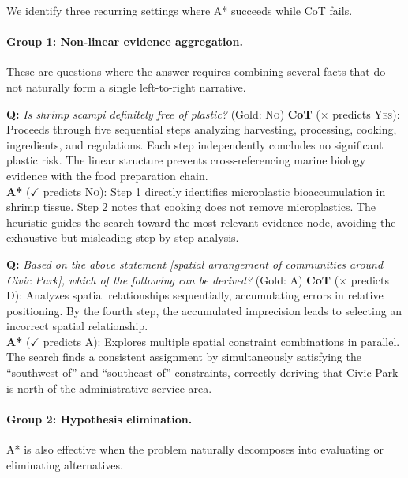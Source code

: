 \documentclass[11pt]{article}
\begin{document}
{We identify three recurring settings where A* succeeds while CoT fails.

\paragraph{Group 1: Non-linear evidence aggregation.}
These are questions where the answer requires combining several facts that do not naturally form a single left-to-right narrative.

\begin{examplebox}[title=StrategyQA --- Non-linear Evidence Aggregation]
\textbf{Q:} \emph{Is shrimp scampi definitely free of plastic?} \quad (Gold: \textsc{No})
\tcblower
\textbf{CoT} ($\times$ predicts \textsc{Yes}): Proceeds through five sequential steps analyzing harvesting, processing, cooking, ingredients, and regulations. Each step independently concludes no significant plastic risk. The linear structure prevents cross-referencing marine biology evidence with the food preparation chain.\\[4pt]
\textbf{A*} ($\checkmark$ predicts \textsc{No}): Step 1 directly identifies microplastic bioaccumulation in shrimp tissue. Step 2 notes that cooking does not remove microplastics. The heuristic guides the search toward the most relevant evidence node, avoiding the exhaustive but misleading step-by-step analysis.
\end{examplebox}

\begin{examplebox}[title=LogicQA --- Non-linear Evidence Aggregation]
\textbf{Q:} \emph{Based on the above statement [spatial arrangement of communities around Civic Park], which of the following can be derived?} \quad (Gold: A)
\tcblower
\textbf{CoT} ($\times$ predicts D): Analyzes spatial relationships sequentially, accumulating errors in relative positioning. By the fourth step, the accumulated imprecision leads to selecting an incorrect spatial relationship.\\[4pt]
\textbf{A*} ($\checkmark$ predicts A): Explores multiple spatial constraint combinations in parallel. The search finds a consistent assignment by simultaneously satisfying the ``southwest of'' and ``southeast of'' constraints, correctly deriving that Civic Park is north of the administrative service area.
\end{examplebox}

\paragraph{Group 2: Hypothesis elimination.}
A* is also effective when the problem naturally decomposes into evaluating or eliminating alternatives.

}
\end{document}
